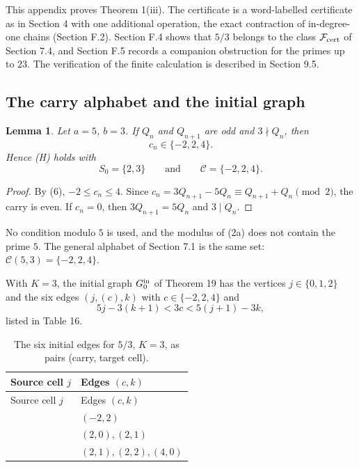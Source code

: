 \documentclass[11pt,reqno]{amsart}
\newtheorem{lemma}[theorem]{Lemma}
\theoremstyle{definition}
\theoremstyle{remark}
\begin{document}
This appendix proves Theorem 1(iii). The certificate is a word-labelled
certificate as in Section 4 with one additional operation, the exact
contraction of in-degree-one chains (Section F.2). Section F.4 shows that
\(5/3\) belongs to the class \(\mathcal F_{\rm cert}\) of Section 7.4,
and Section F.5 records a companion obstruction for the primes up to
\(23\). The verification of the finite calculation is described in
Section 9.5.

\subsection{The carry alphabet and the initial graph}\label{sec:F.1}

\begin{samepage}
\begin{lemma}\leavevmode\label{thm:74}
Let \(a=5\), \(b=3\). If \(Q_n\) and \(Q_{n+1}\) are odd and
\(3\nmid Q_n\), then
\[
c_n\in\{-2,2,4\}.
\]
Hence (H) holds with
\[
S_0=\{2,3\}\qquad \text{and}\qquad \mathcal C=\{-2,2,4\}.
\]
\label{thm-end:74}
\end{lemma}
\end{samepage}

\begin{proof}\leavevmode\label{proof:74}
By (6), \(-2\le c_n\le4\). Since
\(c_n=3Q_{n+1}-5Q_n\equiv Q_{n+1}+Q_n\pmod2\), the carry is even. If
\(c_n=0\), then \(3Q_{n+1}=5Q_n\) and \(3\mid Q_n\). \qedhere
\end{proof}

No condition modulo \(5\) is used, and the modulus of (2a) does not
contain the prime \(5\). The general alphabet of Section 7.1 is the same
set: \(\mathcal C(5,3)=\{-2,2,4\}\).

With \(K=3\), the initial graph \(G_0^{\rm in}\) of Theorem 19 has the
vertices \(j\in\{0,1,2\}\) and the six edges \((j,(c),k)\) with
\(c\in\{-2,2,4\}\) and
\[
5j-3(k+1)<3c<5(j+1)-3k,
\]
listed in Table 16.

\begingroup
\small
\setlength{\tabcolsep}{4pt}
\renewcommand{\arraystretch}{1.15}
\setlength{\LTcapwidth}{\textwidth}
\begin{longtable}{@{}>{\raggedright\arraybackslash}p{} >{\raggedright\arraybackslash}p{}@{}}
\caption{The six initial edges for \(5/3\), \(K=3\), as pairs
(carry, target cell).}\label{tab:16}\\
\toprule
Source cell \(j\) & Edges \((c,k)\) \\
\midrule
\endfirsthead
\toprule
Source cell \(j\) & Edges \((c,k)\) \\
\midrule
\endhead
\bottomrule
\endlastfoot
0 & \((-2,\allowbreak{}2)\) \\*
1 & \((2,\allowbreak{}0),\allowbreak{}(2,\allowbreak{}1)\) \\*
2 & \((2,\allowbreak{}1),\allowbreak{}(2,\allowbreak{}2),\allowbreak{}(4,\allowbreak{}0)\) \\
\end{longtable}
\endgroup
\end{document}
